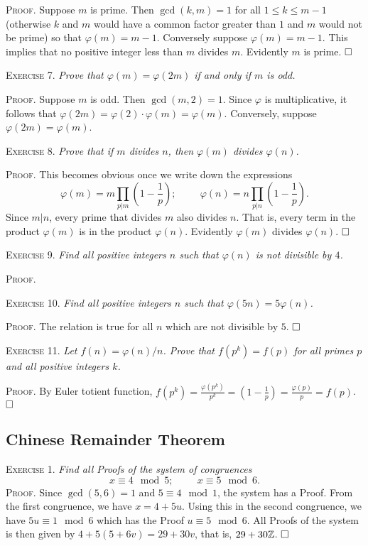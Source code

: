 \documentclass[11pt, leqno]{article}
\newcommand{\done}{\ensuremath{\hfill\square}}
\begin{document}
\textsc{Proof}. Suppose $m$ is prime. Then $\gcd(k,m) = 1$ for all $1\leq k \leq m-1$ (otherwise $k$ and $m$ would have a common factor greater than $1$ and $m$ would not be prime) so that $\varphi(m) = m-1$. Conversely suppose $\varphi(m) = m-1$. This implies that no positive integer less than $m$ divides $m$. Evidently $m$ is prime. \done

\textsc{Exercise 7}. \emph{Prove that $\varphi(m) = \varphi(2m)$ if and only if $m$ is odd.}

\textsc{Proof}. Suppose $m$ is odd. Then $\gcd(m, 2)=1$. Since $\varphi$ is multiplicative, it follows that $\varphi(2m) = \varphi(2)\cdot \varphi(m) = \varphi(m)$. Conversely, suppose $\varphi(2m) = \varphi(m)$.

\textsc{Exercise 8}. \emph{Prove that if $m$ divides $n$, then $\varphi(m)$ divides $\varphi(n)$.}

\textsc{Proof}. This becomes obvious once we write down the expressions
\begin{displaymath}
\varphi(m) = m \prod_{p|m} \left(1-\frac{1}{p}\right); \hspace{1cm} \varphi(n) = n \prod_{p|n} \left(1-\frac{1}{p}\right).
\end{displaymath}
Since $m|n$, every prime that divides $m$ also divides $n$. That is, every term in the product $\varphi(m)$ is in the product $\varphi(n)$. Evidently $\varphi(m)$ divides $\varphi(n)$. \done

\textsc{Exercise 9}. \emph{Find all positive integers $n$ such that $\varphi(n)$ is not divisible by $4$.}

\textsc{Proof}.

\textsc{Exercise 10}. \emph{Find all positive integers $n$ such that $\varphi(5n) = 5\varphi(n)$.}

\textsc{Proof}. The relation is true for all $n$ which are not divisible by $5$. \done

\textsc{Exercise 11}. \emph{Let $f(n) = \varphi(n)/n$. Prove that $f(p^k) = f(p)$ for all primes $p$ and all positive integers $k$.}

\textsc{Proof}. By Euler totient function, $\displaystyle f(p^k) = \frac{\varphi(p^k)}{p^k} = \left(1 - \frac{1}{p}\right) = \frac{\varphi(p)}{p} = f(p)$. \done

\subsection{Chinese Remainder Theorem}

\textsc{Exercise 1}. \emph{Find all Proofs of the system of congruences 
\begin{displaymath}
x \equiv 4 \mod 5; \hspace{1cm} x\equiv 5 \mod 6.
\end{displaymath}}\textsc{Proof}. Since $\gcd(5,6)=1$ and $5 \equiv 4 \mod 1$, the system has a Proof. From the first congruence, we have $x=4+5u$. Using this in the second congruence, we have $5u\equiv 1 \mod 6$ which has the Proof $u \equiv 5 \mod 6$. All Proofs of the system is then given by $4+5(5+6v) = 29 + 30v$, that is, $29+30\mathbb{Z}$. \done
\end{document}
